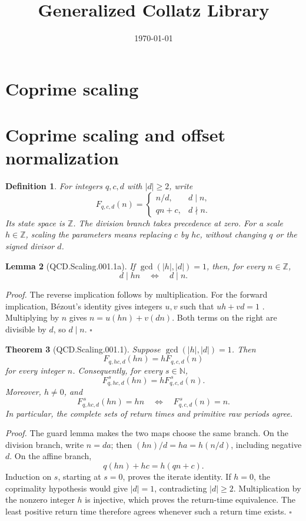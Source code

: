 \documentclass[11pt,letterpaper]{article}
\title{Generalized Collatz Library}
\author{}
\date{\today}
\newcommand{\N}{\mathbb{N}}
\newcommand{\Z}{\mathbb{Z}}
\newtheorem{theorem}{Theorem}
\newtheorem{lemma}[theorem]{Lemma}
\newtheorem{definition}[theorem]{Definition}
\newenvironment{proof}{\noindent\textit{Proof.}}{\hfill\(\square\)}
\begin{document}
\maketitle
\section*{Coprime scaling}

\section{Coprime scaling and offset normalization}

\begin{definition}
For integers \(q,c,d\) with \(|d|\ge2\), write
\[
F_{q,c,d}(n)=
\begin{cases}
n/d,&d\mid n,\\
qn+c,&d\nmid n.
\end{cases}
\]
Its state space is \(\Z\). The division branch takes precedence at zero.
For a scale \(h\in\Z\), scaling the parameters means replacing \(c\) by \(hc\),
without changing \(q\) or the signed divisor \(d\).
\end{definition}

\begin{lemma}[QCD.Scaling.001.1a]
If \(\gcd(|h|,|d|)=1\), then, for every \(n\in\Z\),
\[
d\mid hn\quad\Longleftrightarrow\quad d\mid n.
\]
\end{lemma}
\begin{proof}
The reverse implication follows by multiplication. For the forward implication,
B\'ezout's identity gives integers \(u,v\) such that \(uh+vd=1\)
\cite{Lang02}. Multiplying by \(n\) gives \(n=u(hn)+v(dn)\).
Both terms on the right are divisible by \(d\), so \(d\mid n\).
\end{proof}

\begin{theorem}[QCD.Scaling.001.1]
Suppose \(\gcd(|h|,|d|)=1\). Then
\[
F_{q,hc,d}(hn)=hF_{q,c,d}(n)
\]
for every integer \(n\). Consequently, for every \(s\in\N\),
\[
F_{q,hc,d}^{\,s}(hn)=hF_{q,c,d}^{\,s}(n).
\]
Moreover, \(h\ne0\), and
\[
F_{q,hc,d}^{\,s}(hn)=hn
\quad\Longleftrightarrow\quad
F_{q,c,d}^{\,s}(n)=n.
\]
In particular, the complete sets of return times and primitive raw periods agree.
\end{theorem}
\begin{proof}
The guard lemma makes the two maps choose the same branch. On the division branch,
write \(n=da\); then \((hn)/d=ha=h(n/d)\), including negative \(d\).
On the affine branch,
\[
q(hn)+hc=h(qn+c).
\]
Induction on \(s\), starting at \(s=0\), proves the iterate identity.
If \(h=0\), the coprimality hypothesis would give \(|d|=1\), contradicting
\(|d|\ge2\). Multiplication by the nonzero integer \(h\) is injective, which proves
the return-time equivalence. The least positive return time therefore agrees
whenever such a return time exists.
\end{proof}
\end{document}
